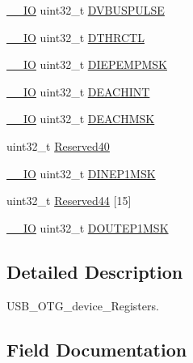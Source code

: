 \begin{DoxyCompactItemize}
\mbox{\hyperlink{core__sc300_8h_aec43007d9998a0a0e01faede4133d6be}{\+\_\+\+\_\+\+IO}} uint32\+\_\+t \mbox{\hyperlink{struct_u_s_b___o_t_g___device_type_def_acc968fd160f83749ad4176ad8cb36fe0}{D\+V\+B\+U\+S\+P\+U\+L\+SE}}
\item 
\mbox{\hyperlink{core__sc300_8h_aec43007d9998a0a0e01faede4133d6be}{\+\_\+\+\_\+\+IO}} uint32\+\_\+t \mbox{\hyperlink{struct_u_s_b___o_t_g___device_type_def_ac5d3a4bffd921da5d69f9a601263b573}{D\+T\+H\+R\+C\+TL}}
\item 
\mbox{\hyperlink{core__sc300_8h_aec43007d9998a0a0e01faede4133d6be}{\+\_\+\+\_\+\+IO}} uint32\+\_\+t \mbox{\hyperlink{struct_u_s_b___o_t_g___device_type_def_a99c6c50a3e3235c81b98a428ebd33d4c}{D\+I\+E\+P\+E\+M\+P\+M\+SK}}
\item 
\mbox{\hyperlink{core__sc300_8h_aec43007d9998a0a0e01faede4133d6be}{\+\_\+\+\_\+\+IO}} uint32\+\_\+t \mbox{\hyperlink{struct_u_s_b___o_t_g___device_type_def_ae85e8a65a72f52a9daf3d2b66b77c2e2}{D\+E\+A\+C\+H\+I\+NT}}
\item 
\mbox{\hyperlink{core__sc300_8h_aec43007d9998a0a0e01faede4133d6be}{\+\_\+\+\_\+\+IO}} uint32\+\_\+t \mbox{\hyperlink{struct_u_s_b___o_t_g___device_type_def_a0234d794aba7ddae31f3da3c02c8a673}{D\+E\+A\+C\+H\+M\+SK}}
\item 
uint32\+\_\+t \mbox{\hyperlink{struct_u_s_b___o_t_g___device_type_def_a9e0c029846e94bf08ac8edb35b30ecb2}{Reserved40}}
\item 
\mbox{\hyperlink{core__sc300_8h_aec43007d9998a0a0e01faede4133d6be}{\+\_\+\+\_\+\+IO}} uint32\+\_\+t \mbox{\hyperlink{struct_u_s_b___o_t_g___device_type_def_ab62b876c61e11199cf5c37aa944a5fed}{D\+I\+N\+E\+P1\+M\+SK}}
\item 
uint32\+\_\+t \mbox{\hyperlink{struct_u_s_b___o_t_g___device_type_def_a8b1e044bd34b12074334270cfd18c931}{Reserved44}} \mbox{[}15\mbox{]}
\item 
\mbox{\hyperlink{core__sc300_8h_aec43007d9998a0a0e01faede4133d6be}{\+\_\+\+\_\+\+IO}} uint32\+\_\+t \mbox{\hyperlink{struct_u_s_b___o_t_g___device_type_def_a196e86fc15ba228188d47468349de69b}{D\+O\+U\+T\+E\+P1\+M\+SK}}
\end{DoxyCompactItemize}


\subsection{Detailed Description}
U\+S\+B\+\_\+\+O\+T\+G\+\_\+device\+\_\+\+Registers. 

\subsection{Field Documentation}
\mbox{\label{struct_u_s_b___o_t_g___device_type_def_a4e15c273373694f64b3f70226cb3ac35}} 
